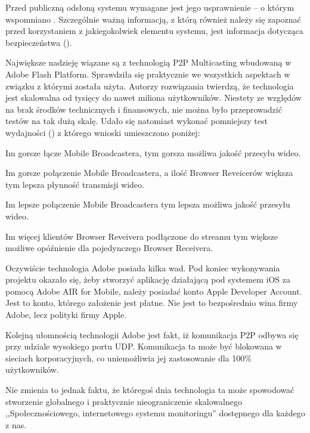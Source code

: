 Przed publiczną odsłoną systemu wymagane jest jego usprawnienie -- o którym wspomniano . Szczególnie ważną informacją, z którą również należy się zapoznać przed korzystaniem z jakiegokolwiek elementu systemu, jest informacja dotycząca bezpieczeństwa ().

Największe nadzieję wiązane są z technologią P2P Multicasting wbudowaną w Adobe Flash Platform. Sprawdziła się praktycznie we wszystkich aspektach w związku z którymi została użyta. Autorzy rozwiązania \cite{MattKauf2009} twierdzą, że technologia jest skalowalna od tysięcy do nawet miliona użytkowników. Niestety ze względów na brak środków technicznych i finansowych, nie można było przeprowadzić testów na tak dużą skalę. Udało się natomiast wykonać pomniejszy test wydajności () z którego wnioski umieszczono poniżej:

\begin{packed_item}
    \item{Im gorsze łącze Mobile Broadcastera, tym gorsza możliwa jakość przesyłu wideo.}
    \item{Im gorsze połączenie Mobile Broadcastera, a ilość Browser Reveicerów większa tym lepsza płynność transmisji wideo.}
    \item{Im lepsze połączenie Mobile Broadcastera tym lepsza możliwa jakość przesyłu wideo.}
    \item{Im więcej klientów Browser Reveivera podłączone do streamu tym większe możliwe opóźnienie dla pojedynczego Browser Receivera.}
\end{packed_item}

Oczywiście technologia Adobe posiada kilka wad. Pod koniec wykonywania projektu okazało się, żeby stworzyć aplikację działającą pod systemem iOS za pomocą Adobe AIR for Mobile, należy posiadać konto Apple Developer Account. Jest to konto, którego założenie jest płatne. Nie jest to bezpośrednio wina firmy Adobe, lecz polityki firmy Apple.

Kolejną ułomnością technologii Adobe jest fakt, iż komunikacja P2P odbywa się przy udziale wysokiego portu UDP. Komunikacja ta może być blokowana w sieciach korporacyjnych, co uniemożliwia jej zastosowanie dla 100\% użytkowników.

Nie zmienia to jednak faktu, że któregoś dnia technologia ta może spowodować stworzenie globalnego i praktycznie nieograniczenie skalowalnego ,,Społecznościowego, internetowego systemu monitoringu'' dostępnego dla każdego z nas.

\newpage

